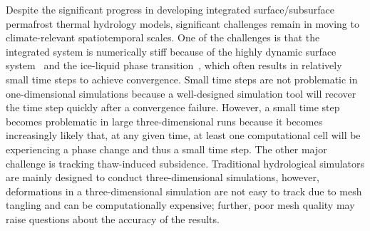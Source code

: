 \documentclass[review,11pt]{elsarticle}
\begin{document}
Despite the significant progress in developing integrated surface/subsurface permafrost thermal hydrology models, significant challenges remain in moving to climate-relevant spatiotemporal scales. One of the challenges is that the integrated system is numerically stiff because of the highly dynamic surface system~\cite{spainter2016integrated} and the ice-liquid phase transition~\cite{dall2011robust}, which often results in relatively small time steps to achieve convergence. Small time steps are not problematic in one-dimensional simulations because a well-designed simulation tool will recover the time step quickly after a convergence failure. However, a small time step becomes problematic in large three-dimensional runs because it becomes increasingly likely that, at any given time, at least one computational cell will be experiencing a phase change and thus a small time step. The other major challenge is tracking thaw-induced subsidence. Traditional hydrological simulators are mainly designed to conduct three-dimensional simulations, however, deformations in a three-dimensional simulation are not easy to track due to mesh tangling and can be computationally expensive; further, poor mesh quality may raise questions about the accuracy of the results. 
\end{document}
